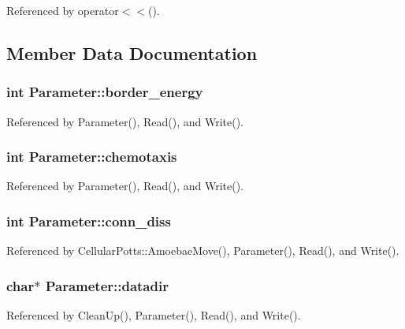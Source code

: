 Referenced by operator$<$$<$().



\subsection{Member Data Documentation}
\subsubsection[{border\-\_\-energy}]{\setlength{\rightskip}{0pt plus 5cm}int Parameter\-::border\-\_\-energy}\label{classParameter_a74a5d8dda11933be5fa245e66eb84ae7}


Referenced by Parameter(), Read(), and Write().

\subsubsection[{chemotaxis}]{\setlength{\rightskip}{0pt plus 5cm}int Parameter\-::chemotaxis}\label{classParameter_a97714f93d9eedf704c0cc90d1cfd8700}


Referenced by Parameter(), Read(), and Write().

\subsubsection[{conn\-\_\-diss}]{\setlength{\rightskip}{0pt plus 5cm}int Parameter\-::conn\-\_\-diss}\label{classParameter_a7a6355f8ab31f60c84d3162bca148e3f}


Referenced by Cellular\-Potts\-::\-Amoebae\-Move(), Parameter(), Read(), and Write().

\subsubsection[{datadir}]{\setlength{\rightskip}{0pt plus 5cm}char$\ast$ Parameter\-::datadir}\label{classParameter_ae5baf621c215b4dadd0bb6552b43e004}


Referenced by Clean\-Up(), Parameter(), Read(), and Write().

